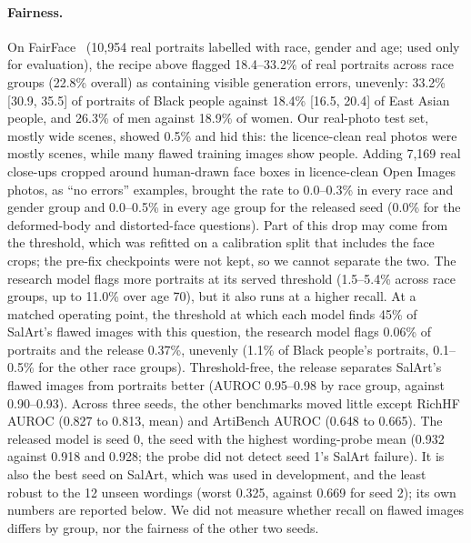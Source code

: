 \documentclass[10pt]{article}
\begin{document}
\paragraph{Fairness.} On FairFace~\cite{fairface2021} (10{,}954 real portraits labelled with race, gender and age; used only for evaluation), the recipe above flagged 18.4--33.2\% of real portraits across race groups (22.8\% overall) as containing visible generation errors, unevenly: 33.2\% [30.9, 35.5] of portraits of Black people against 18.4\% [16.5, 20.4] of East Asian people, and 26.3\% of men against 18.9\% of women. Our real-photo test set, mostly wide scenes, showed 0.5\% and hid this: the licence-clean real photos were mostly scenes, while many flawed training images show people. Adding 7{,}169 real close-ups cropped around human-drawn face boxes in licence-clean Open Images photos, as ``no errors'' examples, brought the rate to 0.0--0.3\% in every race and gender group and 0.0--0.5\% in every age group for the released seed (0.0\% for the deformed-body and distorted-face questions). Part of this drop may come from the threshold, which was refitted on a calibration split that includes the face crops; the pre-fix checkpoints were not kept, so we cannot separate the two. The research model flags more portraits at its served threshold (1.5--5.4\% across race groups, up to 11.0\% over age 70), but it also runs at a higher recall. At a matched operating point, the threshold at which each model finds 45\% of SalArt's flawed images with this question, the research model flags 0.06\% of portraits and the release 0.37\%, unevenly (1.1\% of Black people's portraits, 0.1--0.5\% for the other race groups). Threshold-free, the release separates SalArt's flawed images from portraits better (AUROC 0.95--0.98 by race group, against 0.90--0.93). Across three seeds, the other benchmarks moved little except RichHF AUROC (0.827 to 0.813, mean) and ArtiBench AUROC (0.648 to 0.665). The released model is seed 0, the seed with the highest wording-probe mean (0.932 against 0.918 and 0.928; the probe did not detect seed 1's SalArt failure). It is also the best seed on SalArt, which was used in development, and the least robust to the 12 unseen wordings (worst 0.325, against 0.669 for seed 2); its own numbers are reported below. We did not measure whether recall on flawed images differs by group, nor the fairness of the other two seeds.
\end{document}
